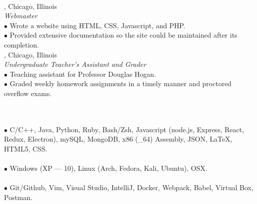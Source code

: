 \documentclass[11pt]{article}
\begin{document}
 \\
, Chicago, Illinois \\
\indent \textit{Webmaster} \\
\indent $\bullet$ Wrote a website using HTML, CSS, Javascript, and PHP.\@ \\
\indent $\bullet$ Provided extensive documentation so the site could be maintained after its completion. \\
, Chicago, Illinois \\
\indent \textit{Undergraduate Teacher's Assistant and Grader} \\
\indent $\bullet$ Teaching assistant for Professor Douglas Hogan. \\
\indent $\bullet$ Graded weekly homework assignments in a timely manner and proctored overflow exams.

 \\
 \\
\indent $\bullet$ C/C++, Java, Python, Ruby, Bash/Zsh, Javascript (node.js, Express, React, Redux, Electron), mySQL, MongoDB, x86 (\_64) Assembly, JSON, \LaTeX, HTML5, CSS.\@ \\
 \\
\indent $\bullet$ Windows (XP --- 10), Linux (Arch, Fedora, Kali, Ubuntu), OSX.\@ \\
 \\
\indent $\bullet$ Git/Github, Vim, Visual Studio, IntelliJ, Docker, Webpack, Babel, Virtual Box, Postman.

\end{document}

